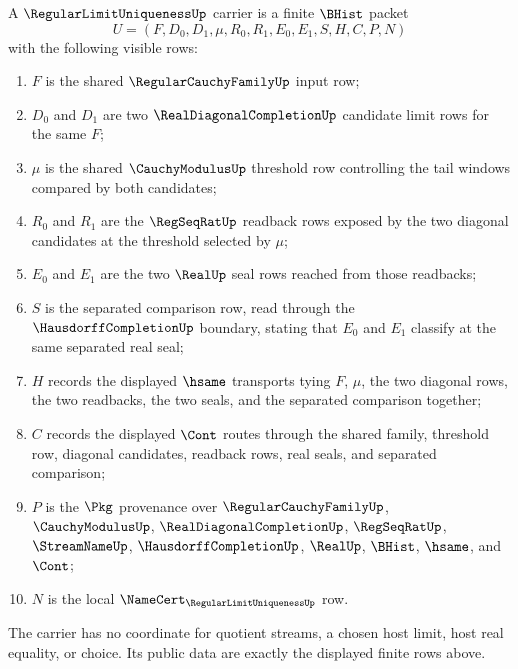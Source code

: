 \begin{definition}
\label{def:regular-limit-uniqueness-carrier}
A $\RegularLimitUniquenessUp$ carrier is a finite $\BHist$ packet
$$
U=(F,D_0,D_1,\mu,R_0,R_1,E_0,E_1,S,H,C,P,N)
$$
with the following visible rows:
\begin{enumerate}
\item $F$ is the shared $\RegularCauchyFamilyUp$ input row;
\item $D_0$ and $D_1$ are two $\RealDiagonalCompletionUp$ candidate limit rows for the same $F$;
\item $\mu$ is the shared $\CauchyModulusUp$ threshold row controlling the tail windows compared by both candidates;
\item $R_0$ and $R_1$ are the $\RegSeqRatUp$ readback rows exposed by the two diagonal candidates at the threshold selected by $\mu$;
\item $E_0$ and $E_1$ are the two $\RealUp$ seal rows reached from those readbacks;
\item $S$ is the separated comparison row, read through the $\HausdorffCompletionUp$ boundary, stating that $E_0$ and $E_1$ classify at the same separated real seal;
\item $H$ records the displayed $\hsame$ transports tying $F$, $\mu$, the two diagonal rows, the two readbacks, the two seals, and the separated comparison together;
\item $C$ records the displayed $\Cont$ routes through the shared family, threshold row, diagonal candidates, readback rows, real seals, and separated comparison;
\item $P$ is the $\Pkg$ provenance over $\RegularCauchyFamilyUp$, $\CauchyModulusUp$, $\RealDiagonalCompletionUp$, $\RegSeqRatUp$, $\StreamNameUp$, $\HausdorffCompletionUp$, $\RealUp$, $\BHist$, $\hsame$, and $\Cont$;
\item $N$ is the local $\NameCert_{\RegularLimitUniquenessUp}$ row.
\end{enumerate}
The carrier has no coordinate for quotient streams, a chosen host limit, host real equality, or choice. Its public data are exactly the displayed finite rows above.
\end{definition}

